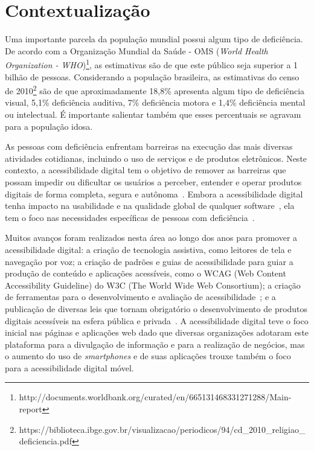 

\section{Contextualização}

Uma importante parcela da população mundial possui algum tipo de deficiência. 
De acordo com a Organização Mundial da Saúde - OMS (\textit{World Health Organization - WHO})\footnote{http://documents.worldbank.org/curated/en/665131468331271288/Main-report}, 
as estimativas são de que este público seja superior a 1 bilhão de pessoas. Considerando a população brasileira, as estimativas do censo de 2010\footnote{https://biblioteca.ibge.gov.br/visualizacao/periodicos/94/cd\_2010\_religiao\_deficiencia.pdf} são de que aproximadamente 18,8\% apresenta algum tipo de deficiência visual, 5,1\% deficiência auditiva, 7\% deficiência motora e 1,4\% deficiência mental ou intelectual. É importante salientar também que esses percentuais se agravam para a população idosa.

As pessoas com deficiência enfrentam barreiras na execução das mais diversas atividades cotidianas, incluindo o uso de serviços e de produtos eletrônicos. 
Neste contexto, a acessibilidade digital tem o objetivo de remover as barreiras que possam impedir ou dificultar os usuários a perceber, entender e operar produtos digitais de forma completa, segura e autônoma~\cite{wcag,w3cwai}.
Embora a acessibilidade digital tenha impacto na usabilidade e na qualidade global de qualquer software~\cite{Gay2018,ISO25010}, ela tem o foco nas necessidades específicas de pessoas com deficiência~\cite{ISO9241:11}.


Muitos avanços foram realizados nesta área ao longo dos anos para promover a acessibilidade digital: a criação de tecnologia assistiva, como leitores de tela e navegação por voz; 
a criação de padrões e guias de acessibilidade para guiar a produção de conteúdo e aplicações acessíveis, como o WCAG (Web Content Accessibility Guideline) do W3C (The World Wide Web Consortium);
a criação de ferramentas para o desenvolvimento e avaliação de acessibilidade~\cite{Silva2018survey};
e a publicação de diversas leis que tornam obrigatório o desenvolvimento de produtos digitais acessíveis na esfera pública e privada~\cite{Lazar2019}.
A acessibilidade digital teve o foco inicial nas páginas e aplicações web dado que diversas organizações adotaram este plataforma para a divulgação de informação e para a realização de negócios, mas o aumento do uso de \textit{smartphones} e de suas aplicações trouxe também o foco para a acessibilidade digital móvel.


